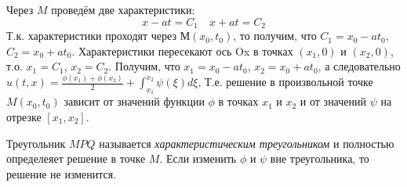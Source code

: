 \documentclass[../main.tex]{subfiles}
\begin{document}
Через $M$ проведём две характеристики:
$$x-at=C_1 \quad x+at=C_2$$ 
Т.к. характеристики проходят через $М(x_0, t_0)$, то получим, что $C_1 = x_0 - at_0$, $C_2 = x_0 + at_0$.
Характеристики пересекают ось Ox в точках $(x_1,0)$ и $(x_2,0)$, т.о. $x_1 = C_1$, $x_2 = C_2$.
Получим, что $x_1 = x_0 -at_0$, $x_2 = x_0 + at_0$,
а следовательно $u(t, x) = \frac{\phi(x_1) + \phi(x_2)}{2} + \int_{x_1}^{x_2}\psi(\xi)d\xi$,
Т.е. решение в произвольной точке $M(x_0, t_0)$ зависит от значений функции $\phi$
в точках $x_1$ и $x_2$ и от значений $\psi$ на отрезке $[x_1, x_2]$.

Треугольник $MPQ$ называется \textit{характеристическим треугольником} и полностью определеяет решение в точке $M$.
Если изменить $\phi$ и $\psi$ вне треугольника, то решение не изменится.
\end{document}
